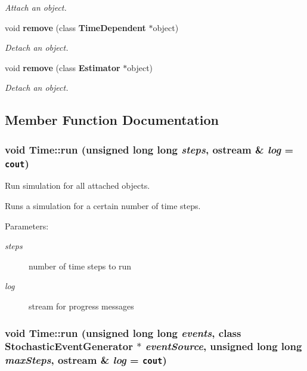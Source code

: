 \begin{CompactItemize}
\begin{CompactList}\small\item\em Attach an object. \item\end{CompactList}\item 
void {\bf remove} (class {\bf TimeDependent} $\ast$object)\label{classTime_8c0290a43c118078cfdd824e57ac6723}

\begin{CompactList}\small\item\em Detach an object. \item\end{CompactList}\item 
void {\bf remove} (class {\bf Estimator} $\ast$object)\label{classTime_12019d8f5cc8a47d50cd1ac8e77ee4ca}

\begin{CompactList}\small\item\em Detach an object. \item\end{CompactList}\end{CompactItemize}


\subsection{Member Function Documentation}
\subsubsection[run]{\setlength{\rightskip}{0pt plus 5cm}void Time::run (unsigned long long {\em steps}, \/  ostream \& {\em log} = {\tt cout})}\label{classTime_0a03cab1c544cfac3fb164d39651710d}


Run simulation for all attached objects. 

Runs a simulation for a certain number of time steps. \begin{Desc}
\item[Parameters: ]\par
\begin{description}
\item[{\em 
steps}]number of time steps to run \item[{\em 
log}]stream for progress messages \end{description}
\end{Desc}
\subsubsection[run]{\setlength{\rightskip}{0pt plus 5cm}void Time::run (unsigned long long {\em events}, \/  class {\bf StochasticEventGenerator} $\ast$ {\em eventSource}, \/  unsigned long long {\em maxSteps}, \/  ostream \& {\em log} = {\tt cout})}\label{classTime_1918f0b5253217405077d487838f8e16}


